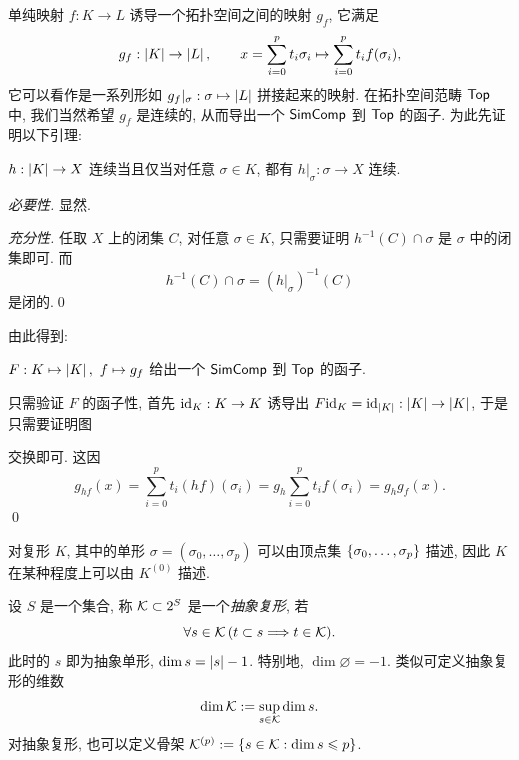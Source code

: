    单纯映射 $ f : K\to L $ 诱导一个拓扑空间之间的映射 $ g_f $, 它满足
    \[
        g_f : \left| K \right| \to\left| L \right| ,\qquad x=\sum_{i=0}^pt_i\sigma_i\mapsto \sum_{i=0}^pt_if(\sigma_i),
    \]
    它可以看作是一系列形如 $ g_f|_\sigma : \sigma\mapsto\left| L \right|  $ 拼接起来的映射. 在拓扑空间范畴 $ \mathsf{Top} $ 中, 我们当然希望 $ g_f $ 是连续的, 从而导出一个 $ \mathsf{SimComp} $ 到 $ \mathsf{Top} $ 的函子. 为此先证明以下引理:

    \begin{Lemma}
        $ h : \left| K \right| \to X $ 连续当且仅当对任意 $ \sigma\in K $, 都有 $ h|_\sigma : \sigma\to X $ 连续.
    \end{Lemma}
    \begin{Proof}
        \textit{必要性.} 显然.

        \textit{充分性.} 任取 $ X $ 上的闭集 $ C $, 对任意 $ \sigma\in K $, 只需要证明 $ h^{-1}(C)\cap\sigma $ 是 $ \sigma $ 中的闭集即可. 而
        \[
            h^{-1}(C)\cap \sigma=(h|_\sigma)^{-1}(C)
        \]
        是闭的.\qed
    \end{Proof}

    由此得到:

    \begin{Proposition}
        $ F : K\mapsto\left| K \right| ,\ f\mapsto g_f $ 给出一个 $ \mathsf{SimComp} $ 到 $ \mathsf{Top} $ 的函子.
    \end{Proposition}
    \begin{Proof}
        只需验证 $ F $ 的函子性, 首先 $ \mathrm{id}_K : K\to K $ 诱导出 $ F\mathrm{id}_K=\mathrm{id}_{\left| K \right| } : \left| K \right| \to\left| K \right|  $, 于是只需要证明图
        \begin{center}
        \end{center}
        交换即可. 这因
        \[
            g_{hf}(x)=\sum_{i=0}^pt_i(hf)(\sigma_i)=g_h\sum_{i=0}^pt_if(\sigma_i)=g_hg_f(x).
        \]\qed
    \end{Proof}

	对复形 $ K $, 其中的单形 $ \sigma=(\sigma_0,\dots,\sigma_p) $ 可以由顶点集 $ \left\{ \sigma_0,\dots,\sigma_p \right\} $ 描述, 因此 $ K $ 在某种程度上可以由 $ K^{(0)} $ 描述.

    \begin{Definition}[抽象复形]
        设 $ S $ 是一个集合, 称 $ \mathcal{K}\subset 2^S $ 是一个\emph{抽象复形}, 若
        \[
            \forall s\in\mathcal{K}\,(t\subset s\Longrightarrow t\in\mathcal{K}).
        \]
        此时的 $ s $ 即为抽象单形, $ \dim s=\left| s \right| -1 $. 特别地, $ \dim\varnothing=-1 $. 类似可定义抽象复形的维数
        \[
            \dim\mathcal{K}:=\sup_{s\in\mathcal{K}}\dim s.
        \]
        对抽象复形, 也可以定义骨架 $ \mathcal{K}^{(p)}:=\left\{ s\in\mathcal{K} : \dim s\leqslant p \right\} $.
    \end{Definition}

